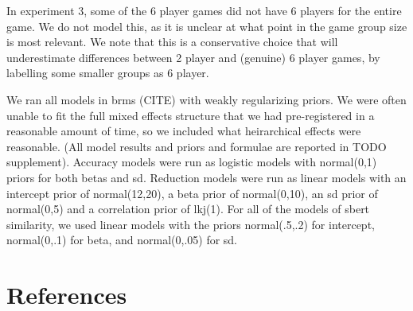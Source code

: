 \documentclass[
  english,
  a4paper,
]{article}
\begin{document}
In experiment 3, some of the 6 player games did not have 6 players for the entire game. We do not model this, as it is unclear at what point in the game group size is most relevant. We note that this is a conservative choice that will underestimate differences between 2 player and (genuine) 6 player games, by labelling some smaller groups as 6 player.

We ran all models in brms (CITE) with weakly regularizing priors. We were often unable to fit the full mixed effects structure that we had pre-registered in a reasonable amount of time, so we included what heirarchical effects were reasonable. (All model results and priors and formulae are reported in TODO supplement). Accuracy models were run as logistic models with normal(0,1) priors for both betas and sd. Reduction models were run as linear models with an intercept prior of normal(12,20), a beta prior of normal(0,10), an sd prior of normal(0,5) and a correlation prior of lkj(1). For all of the models of sbert similarity, we used linear models with the priors normal(.5,.2) for intercept, normal(0,.1) for beta, and normal(0,.05) for sd.

\hypertarget{references}{%
\section{References}\label{references}}

\setlength{\parindent}{-0.1in} 
\setlength{\leftskip}{0.125in}

\noindent
\end{document}
